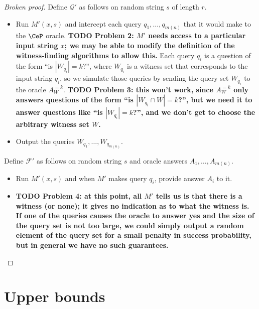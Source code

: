 \documentclass{article}
\newcommand{\todo}[1]{\textbf{TODO #1}}
\newcommand{\mc}{\mathcal}
\begin{document}
\begin{proof}[Broken proof]
  Define $\mc{Q}'$ as follows on random string $s$ of length $r$.
  \begin{itemize}
  \item Run $M'(x, s)$ and intercept each query $q_1, \dotsc, q_{m(n)}$ that it would make to the $\CeP$ oracle.
    \todo{Problem 2: $M'$ needs access to a particular input string $x$; we may be able to modify the definition of the witness-finding algorithms to allow this.}
    Each query $q_i$ is a question of the form ``is $|W_{q_i}| = k$?'', where $W_{q_i}$ is a witness set that corresponds to the input string $q_i$, so we simulate those queries by sending the query set $W_{q_i}$ to the oracle $A^{= k}_W$.
    \todo{Problem 3: this won't work, since $A^{= k}_W$ only answers questions of the form ``is $|W_{q_i} \cap W| = k$?'', but we need it to answer questions like ``is $|W_{q_i}| = k$?'', and we don't get to choose the arbitrary witness set $W$.}
  \item Output the queries $W_{q_1}, \dotsc, W_{q_{m(n)}}$.
  \end{itemize}
  Define $\mc{F}'$ as follows on random string $s$ and oracle answers $A_1, \dotsc, A_{m(n)}$.
  \begin{itemize}
  \item Run $M'(x, s)$ and when $M'$ makes query $q_i$, provide answer $A_i$ to it.
  \item \todo{Problem 4: at this point, all $M'$ tells us is that there is a witness (or none); it gives no indication as to what the witness is.
    If one of the queries causes the oracle to answer yes and the size of the query set is not too large, we could simply output a random element of the query set for a small penalty in success probability, but in general we have no such guarantees.}
  \end{itemize}
\end{proof}

\section{Upper bounds}
\end{document}
